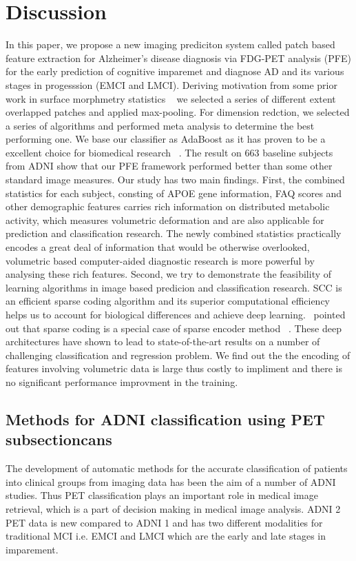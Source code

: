 \documentclass[authoryear,preprint,revi	ew,12pt]{elsarticle}
\begin{document}
\section{Discussion}
In this paper, we propose a new imaging prediciton system called patch based feature extraction for Alzheimer's disease diagnosis via FDG-PET analysis (PFE) for the early prediction of cognitive imparemet and diagnose AD and its various stages in progesssion (EMCI and LMCI). Deriving motivation from some prior work in surface morphmetry statistics ~\citep{zhang2016applyiong,zhang2016hyperbolic}  we selected a series of different extent overlapped patches and applied max-pooling. For dimension redction, we selected a series of algorithms and performed meta analysis to determine the best performing one. We base our classifier as AdaBoost as it has proven to be a excellent choice for biomedical research ~\citep{?.?}. The result on 663 baseline subjects from ADNI show that our PFE framework performed better than some other standard image measures. Our study has two main findings. First, the combined statistics for each subject, consting of APOE gene information, FAQ scores and other demographic features carries rich information on distributed metabolic activity, which measures volumetric deformation and are also applicable for prediction and classification research. The newly combined statistics practically encodes a great deal of information that would be otherwise overlooked, volumetric based computer-aided diagnostic research is more powerful by analysing these rich features. Second, we try to demonstrate the feasibility of learning algorithms in image based predicion and classification research. SCC is an efficient sparse coding algorithm and its superior computational efficiency helps us to account for biological differences and achieve deep learning.~\cite{gregor2010learning} pointed out that sparse coding is a special case of sparse encoder method ~\citep{vincent2010stacked,baldi2012autoencoders}. These deep architectures have shown to lead to state-of-the-art results on a number of challenging classification and regression problem. We find out the the encoding of features involving volumetric data is large thus costly to impliment and there is no significant performance improvment in the training.  

\subsection{Methods for ADNI classification using PET subsectioncans}
The development of automatic methods for the accurate classification of patients into clinical groups from imaging data has been the aim of a number of ADNI studies. Thus PET classification plays an important role in medical image retrieval, which is a part of decision making in medical image analysis. ADNI 2 PET data is new compared to ADNI 1 and has two different modalities for traditional MCI i.e. EMCI and LMCI which are the early and late stages in imparement.
\end{document}
